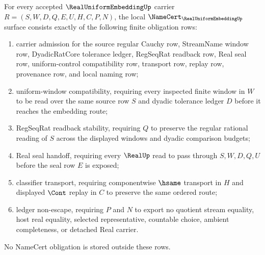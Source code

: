 \begin{theorem}
\label{thm:real-uniform-embedding-namecert-obligations}
For every accepted $\RealUniformEmbeddingUp$ carrier $R=(S,W,D,Q,E,U,H,C,P,N)$, the local $\NameCert_{\RealUniformEmbeddingUp}$ surface consists exactly of the following finite obligation rows:
\begin{enumerate}
\item carrier admission for the source regular Cauchy row, StreamName window row, DyadicRatCore tolerance ledger, RegSeqRat readback row, Real seal row, uniform-control compatibility row, transport row, replay row, provenance row, and local naming row;
\item uniform-window compatibility, requiring every inspected finite window in $W$ to be read over the same source row $S$ and dyadic tolerance ledger $D$ before it reaches the embedding route;
\item RegSeqRat readback stability, requiring $Q$ to preserve the regular rational reading of $S$ across the displayed windows and dyadic comparison budgets;
\item Real seal handoff, requiring every $\RealUp$ read to pass through $S,W,D,Q,U$ before the seal row $E$ is exposed;
\item classifier transport, requiring componentwise $\hsame$ transport in $H$ and displayed $\Cont$ replay in $C$ to preserve the same ordered route;
\item ledger non-escape, requiring $P$ and $N$ to export no quotient stream equality, host real equality, selected representative, countable choice, ambient completeness, or detached Real carrier.
\end{enumerate}
No NameCert obligation is stored outside these rows.
\end{theorem}
